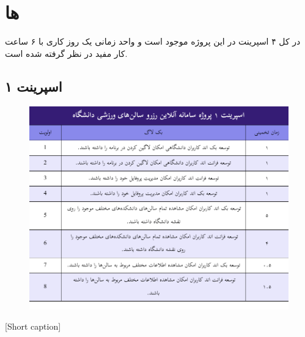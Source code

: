 \section{
ها
}
در کل ۴ اسپرینت در این پروژه موجود است و واحد زمانی یک روز کاری با ۶ ساعت کار مفید در نظر گرفته شده است.

\subsection{
اسپرینت ۱
}
\begin{center}
  \begin{figure} [H]
    { \includegraphics[page=1, width=\textwidth]{appandecies/sprint_1.pdf}}
  \end{figure}
  [Short caption]{}
\end{center}

